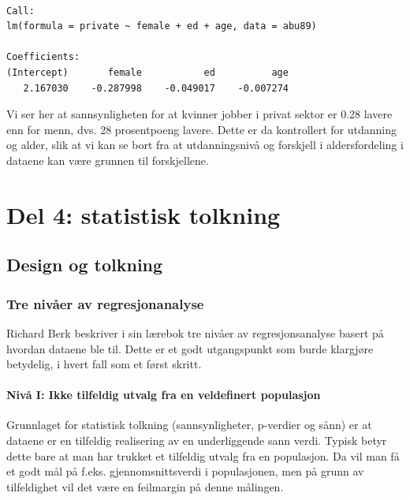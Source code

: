 \documentclass[
  letterpaper,
  DIV=11,
  numbers=noendperiod]{scrreprt}
\theoremstyle{definition}
\theoremstyle{remark}
\begin{document}
\begin{verbatim}

Call:
lm(formula = private ~ female + ed + age, data = abu89)

Coefficients:
(Intercept)       female           ed          age  
   2.167030    -0.287998    -0.049017    -0.007274  
\end{verbatim}

Vi ser her at sannsynligheten for at kvinner jobber i privat sektor er
0.28 lavere enn for menn, dvs. 28 prosentpoeng lavere. Dette er da
kontrollert for utdanning og alder, slik at vi kan se bort fra at
utdanningsnivå og forskjell i aldersfordeling i dataene kan være grunnen
til forskjellene.

\part{Del 4: statistisk tolkning}

\hypertarget{design-og-tolkning}{%
\chapter{Design og tolkning}\label{design-og-tolkning}}

\hypertarget{tre-nivuxe5er-av-regresjonanalyse}{%
\section{Tre nivåer av
regresjonanalyse}\label{tre-nivuxe5er-av-regresjonanalyse}}

Richard Berk beskriver i sin lærebok tre nivåer av regresjonsanalyse
basert på hvordan dataene ble til. Dette er et godt utgangspunkt som
burde klargjøre betydelig, i hvert fall som et først skritt.

\hypertarget{nivuxe5-i-ikke-tilfeldig-utvalg-fra-en-veldefinert-populasjon}{%
\subsection{Nivå I: Ikke tilfeldig utvalg fra en veldefinert
populasjon}\label{nivuxe5-i-ikke-tilfeldig-utvalg-fra-en-veldefinert-populasjon}}

Grunnlaget for statistisk tolkning (sannsynligheter, p-verdier og sånn)
er at dataene er en tilfeldig realisering av en underliggende sann
verdi. Typisk betyr dette bare at man har trukket et tilfeldig utvalg
fra en populasjon. Da vil man få et godt mål på f.eks.
gjennomsnittsverdi i populasjonen, men på grunn av tilfeldighet vil det
være en feilmargin på denne målingen.
\end{document}
